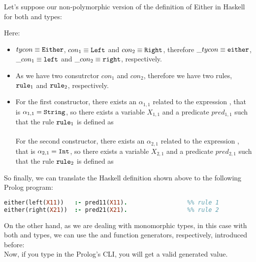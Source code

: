 \begin{example}
	Let's suppose our non-polymorphic version of the definition of Either in Haskell for both  and  types:
	
	Here:
	\begin{itemize}
		\item $tycon \equiv \texttt{Either}$, $con_1 \equiv \texttt{Left}$ and $con_2 \equiv \texttt{Right}$, therefore $\_tycon \equiv \texttt{either}$, $\_con_1 \equiv \texttt{left}$ and $\_con_2 \equiv \texttt{right}$, respectively.
		\item As we have two consutrctor $con_1$ and $con_2$, therefore we have two rules, $\texttt{rule}_1$ and $\texttt{rule}_2$, respectively.
		\item For the first constructor, there exists an $\alpha_{1,1}$ related to the expression , that is $\alpha_{1,1} = \texttt{String}$, so there exists a variable $X_{1,1}$ and a predicate $pred_{1,1}$ such that the rule $\texttt{rule}_1$ is defined as \\\\
		      For the second constructor, there exists an $\alpha_{2,1}$ related to the expression , that is $\alpha_{2,1} = \texttt{Int}$, so there exists a variable $X_{2,1}$ and a predicate $pred_{2,1}$ such that the rule $\texttt{rule}_2$ is defined as 
	\end{itemize}
	So finally, we can translate the Haskell definition shown above to the following Prolog program:\\
	\begin{lstlisting}[language=Prolog]
either(left(X11)) 	:- pred11(X11).					%% rule 1
either(right(X21)) 	:- pred21(X21).					%% rule 2
	\end{lstlisting}
	On the other hand, as we are dealing with monomorphic types, in this case with both  and  types, we can use the  and  function generators, respectively, introduced before:\\
	
	Now, if you type  in the Prolog's CLI, you will get a valid  generated value.\\
\end{example}
